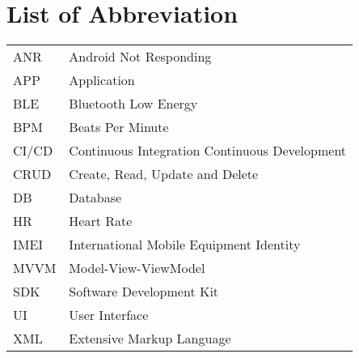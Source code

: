 \chapter{List of Abbreviation}

\begin{longtable}{p{} p{}}
    ANR & Android Not Responding \\
    APP & Application \\
    BLE & Bluetooth Low Energy \\
    BPM & Beats Per Minute \\
    CI/CD & Continuous Integration Continuous Development \\
    CRUD & Create, Read, Update and Delete \\
    DB & Database \\
    HR & Heart Rate \\
    IMEI & International Mobile Equipment Identity \\
    MVVM & Model-View-ViewModel \\
    SDK & Software Development Kit \\
    UI & User Interface \\
    XML & Extensive Markup Language \\

\end{longtable}